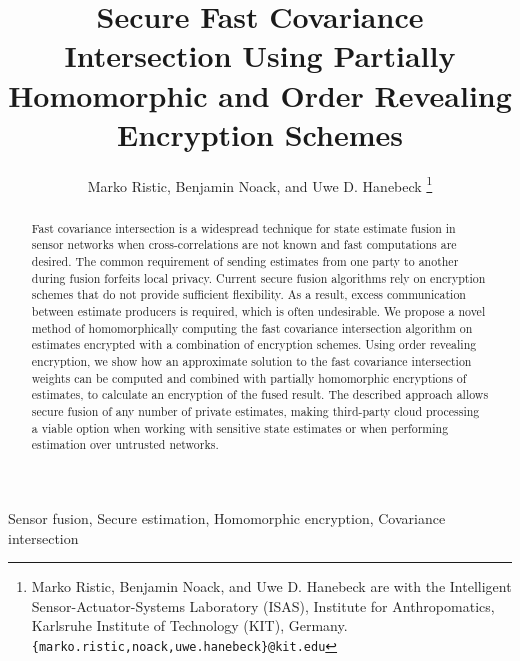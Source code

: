\documentclass[letterpaper, 10 pt, journal, twoside]{ieeetran}  %
\title{
Secure Fast Covariance Intersection Using Partially Homomorphic and Order Revealing Encryption Schemes
}
\author{Marko Ristic, Benjamin Noack, and Uwe D. Hanebeck%
\thanks{Marko Ristic, Benjamin Noack, and Uwe D. Hanebeck are with the Intelligent Sensor-Actuator-Systems Laboratory (ISAS), Institute for Anthropomatics, Karlsruhe Institute of Technology (KIT), Germany.\newline
{\tt\small \{marko.ristic,noack,uwe.hanebeck\}@kit.edu}%
}%
}
\begin{document}
\maketitle
\pagestyle{empty}
\thispagestyle{empty}




\begin{abstract}

Fast covariance intersection is a widespread technique for state estimate fusion in sensor networks when cross-correlations are not known and fast computations are desired. The common requirement of sending estimates from one party to another during fusion forfeits local privacy. Current secure fusion algorithms rely on encryption schemes that do not provide sufficient flexibility. As a result, excess communication between estimate producers is required, which is often undesirable. We propose a novel method of homomorphically computing the fast covariance intersection algorithm on estimates encrypted with a combination of encryption schemes. Using order revealing encryption, we show how an approximate solution to the fast covariance intersection weights can be computed and combined with partially homomorphic encryptions of estimates, to calculate an encryption of the fused result. The described approach allows secure fusion of any number of private estimates, making third-party cloud processing a viable option when working with sensitive state estimates or when performing estimation over untrusted networks.

\end{abstract}

\begin{IEEEkeywords}
Sensor fusion, Secure estimation, Homomorphic encryption, Covariance intersection
\end{IEEEkeywords}


\end{document}
